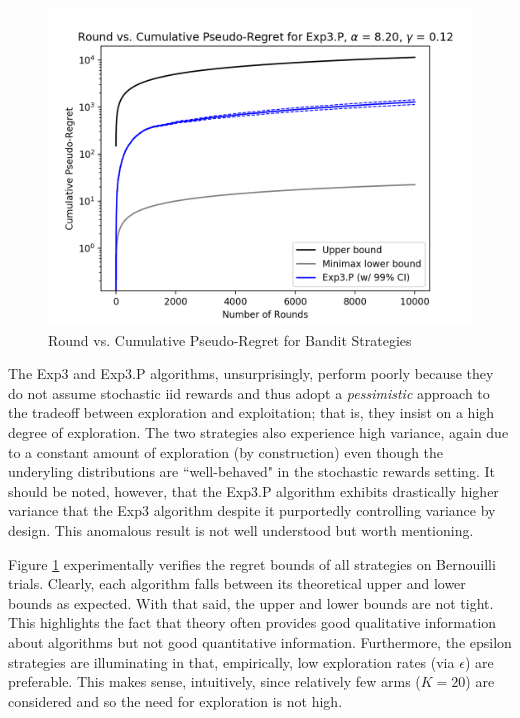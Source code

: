 \documentclass[12pt]{article}
\begin{document}
\begin{figure}[H]
\begin{minipage}[h]{0.5\linewidth}
\end{minipage}
\begin{minipage}[h]{0.5\linewidth}
\includegraphics[width=\linewidth, height=0.75\linewidth]{exp3P-2.png}
\end{minipage}
\captionsetup{justification=centering}
\caption{Round vs. Cumulative Pseudo-Regret for Bandit Strategies}
\label{fig:stochastic-rewards-2}
\end{figure}

The Exp3 and Exp3.P algorithms, unsurprisingly, perform poorly because they do not assume stochastic iid rewards and thus adopt a \textit{pessimistic} approach to the tradeoff between exploration and exploitation; that is, they insist on a high degree of exploration. The two strategies also experience high variance, again due to a constant amount of exploration (by construction) even though the underyling distributions are ``well-behaved" in the stochastic rewards setting. It should be noted, however, that the Exp3.P algorithm exhibits drastically higher variance that the Exp3 algorithm despite it purportedly controlling variance by design. This anomalous result is not well understood but worth mentioning.

Figure \ref{fig:stochastic-rewards-2} experimentally verifies the regret bounds of all strategies on Bernouilli trials. Clearly, each algorithm falls between its theoretical upper and lower bounds as expected. With that said, the upper and lower bounds are not tight. This highlights the fact that theory often provides good qualitative information about algorithms but not good quantitative information. Furthermore, the epsilon strategies are illuminating in that, empirically, low exploration rates (via $\epsilon$) are preferable. This makes sense, intuitively, since relatively few arms ($K=20$) are considered and so the need for exploration is not high.
\end{document}
